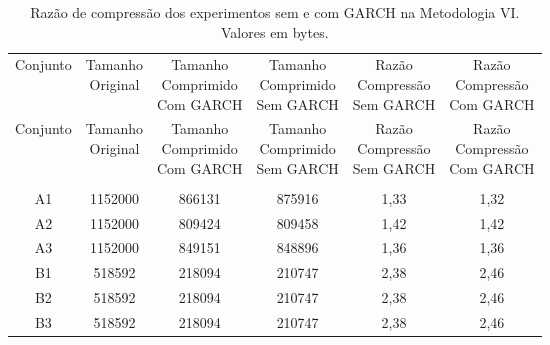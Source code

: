 \begin{center}
\begin{longtable}{cccccc}
\toprule
\rowcolor{white}
\caption[Metodologia VI: Razão de compressão]{Razão de compressão dos
experimentos sem e com GARCH na Metodologia VI.
Valores em bytes.} \label{Tab:razaocompressaoMet6} \\
\midrule
Conjunto & \specialcell{Tamanho \\Original} & \specialcell{Tamanho
\\Comprimido\\Com GARCH} & \specialcell{Tamanho
\\Comprimido\\Sem GARCH} & \specialcell{Razão \\Compressão
\\Sem GARCH} & \specialcell{Razão \\Compressão
\\Com GARCH} \\
\midrule
\endfirsthead
\midrule
\rowcolor{white}
Conjunto & \specialcell{Tamanho \\Original} & \specialcell{Tamanho
\\Comprimido\\Com GARCH} & \specialcell{Tamanho
\\Comprimido\\Sem GARCH} & \specialcell{Razão \\Compressão
\\Sem GARCH} & \specialcell{Razão \\Compressão
\\Com GARCH} \\
\toprule
\endhead
\midrule \\ %
\endfoot
\bottomrule
\endlastfoot
    A1    & 1152000 & 866131 & 875916 & 1,33  & 1,32 \\
    A2    & 1152000 & 809424 & 809458 & 1,42  & 1,42 \\
    A3    & 1152000 & 849151 & 848896 & 1,36  & 1,36 \\
    B1    & 518592 & 218094 & 210747 & 2,38  & 2,46 \\
    B2    & 518592 & 218094 & 210747 & 2,38  & 2,46 \\
    B3    & 518592 & 218094 & 210747 & 2,38  & 2,46 \\

\end{longtable}
\end{center}

